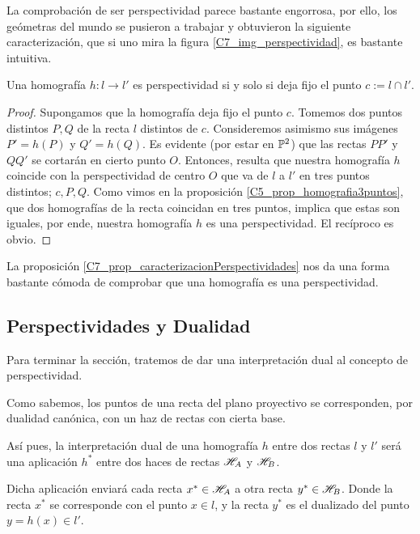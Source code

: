 La comprobación de ser perspectividad parece bastante engorrosa, por ello, los geómetras del mundo se pusieron a trabajar y obtuvieron la siguiente caracterización, que si uno mira la figura \ref{C7_img_perspectividad}, es bastante intuitiva.
\begin{prop}
	\label{C7_prop_caracterizacionPerspectividades}
	Una homografía $h:l\to l'$ es perspectividad si y solo si deja fijo el punto $c:=l\cap l'$.
\end{prop}
\begin{proof}
	Supongamos que la homografía deja fijo el punto $c$. Tomemos dos puntos distintos $P,Q$ de la recta $l$ distintos de $c$. Consideremos asimismo sus imágenes $P'=h(P)$ y $Q'=h(Q)$. Es evidente (por estar en $\mathbb{P}^2$) que las rectas $PP'$ y $QQ'$ se cortarán en cierto punto $O$. Entonces, resulta que nuestra homografía $h$ coincide con la perspectividad de centro $O$ que va de $l$ a $l'$ en tres puntos distintos; $c, P, Q$. Como vimos en la proposición \ref{C5_prop_homografia3puntos}, que dos homografías de la recta coincidan en tres puntos, implica que estas son iguales, por ende, nuestra homografía $h$ es una perspectividad. El recíproco es obvio.
\end{proof}
La proposición \ref{C7_prop_caracterizacionPerspectividades} nos da una forma bastante cómoda de comprobar que una homografía es una perspectividad.
\subsection{Perspectividades y Dualidad}
Para terminar la sección, tratemos de dar una interpretación dual al concepto de perspectividad.

Como sabemos, los puntos de una recta del plano proyectivo se corresponden, por dualidad canónica, con un haz de rectas con cierta base.

Así pues, la interpretación dual de una homografía $h$ entre dos rectas $l$ y $l'$ será una aplicación $h^*$ entre dos haces de rectas $\mathscr{H}_A$ y $\mathscr{H}_B$.

Dicha aplicación enviará cada recta $x^*\in\mathscr{H}_A$ a otra recta $y^*\in\mathscr{H}_B$. Donde la recta $x^*$ se corresponde con el punto $x\in l$, y la recta $y^*$ es el dualizado del punto $y=h(x)\in l'$.

